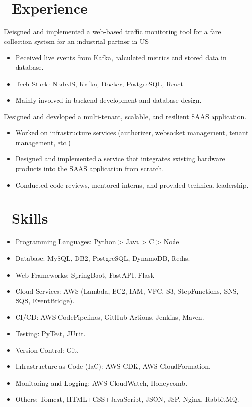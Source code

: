 \documentclass{resume}
\begin{document}
\section{\faUsers\ Experience}
Deisgned and implemented a web-based traffic monitoring tool for a fare collection system for an industrial partner in US
\begin{itemize}
  \item Received live events from Kafka, calculated metrics and stored data in database.
  \item Tech Stack: NodeJS, Kafka, Docker, PostgreSQL, React.
  \item Mainly involved in backend development and database design.
\end{itemize}

 {Designed and developed a multi-tenant, scalable, and resilient SAAS application.}
\begin{itemize}
  \item Worked on infrastructure services (authorizer, websocket management, tenant management, etc.)
  \item Designed and implemented a service that integrates existing hardware products into the SAAS application from scratch.
  \item Conducted code reviews, mentored interns, and provided technical leadership.
\end{itemize}

\section{\faCogs\ Skills}
\begin{itemize}[parsep=0.5ex]
  \item Programming Languages: Python > Java > C > Node
  \item Database: MySQL, DB2, PostgreSQL, DynamoDB, Redis.
  \item Web Frameworks: SpringBoot, FastAPI, Flask.
  \item Cloud Services: AWS (Lambda, EC2, IAM, VPC, S3, StepFunctions, SNS, SQS, EventBridge).
  \item CI/CD: AWS CodePipelines, GitHub Actions, Jenkins, Maven.
  \item Testing: PyTest, JUnit.
  \item Version Control: Git.
  \item Infrastructure as Code (IaC): AWS CDK, AWS CloudFormation.
  \item Monitoring and Logging: AWS CloudWatch, Honeycomb.
  \item Others: Tomcat, HTML+CSS+JavaScript, JSON, JSP, Nginx, RabbitMQ.
\end{itemize}
\end{document}
